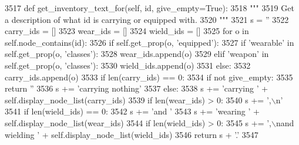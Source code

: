 \begin{DoxyCode}
3517     \textcolor{keyword}{def }get\_inventory\_text\_for(self, id, give\_empty=True):
3518         \textcolor{stringliteral}{"""}
3519 \textcolor{stringliteral}{        Get a description of what id is carrying or equipped with.}
3520 \textcolor{stringliteral}{        """}
3521         s = \textcolor{stringliteral}{''}
3522         carry\_ids = []
3523         wear\_ids = []
3524         wield\_ids = []
3525         \textcolor{keywordflow}{for} o \textcolor{keywordflow}{in} self.node\_contains(id):
3526             \textcolor{keywordflow}{if} self.get\_prop(o, \textcolor{stringliteral}{'equipped'}):
3527                 \textcolor{keywordflow}{if} \textcolor{stringliteral}{'wearable'} \textcolor{keywordflow}{in} self.get\_prop(o, \textcolor{stringliteral}{'classes'}):
3528                     wear\_ids.append(o)
3529                 \textcolor{keywordflow}{elif} \textcolor{stringliteral}{'weapon'} \textcolor{keywordflow}{in} self.get\_prop(o, \textcolor{stringliteral}{'classes'}):
3530                     wield\_ids.append(o)
3531             \textcolor{keywordflow}{else}:
3532                 carry\_ids.append(o)
3533         \textcolor{keywordflow}{if} len(carry\_ids) == 0:
3534             \textcolor{keywordflow}{if} \textcolor{keywordflow}{not} give\_empty:
3535                 \textcolor{keywordflow}{return} \textcolor{stringliteral}{''}
3536             s += \textcolor{stringliteral}{'carrying nothing'}
3537         \textcolor{keywordflow}{else}:
3538             s += \textcolor{stringliteral}{'carrying '} + self.display\_node\_list(carry\_ids)
3539         \textcolor{keywordflow}{if} len(wear\_ids) > 0:
3540             s += \textcolor{stringliteral}{',\(\backslash\)n'}
3541             \textcolor{keywordflow}{if} len(wield\_ids) == 0:
3542                 s += \textcolor{stringliteral}{'and '}
3543             s += \textcolor{stringliteral}{'wearing '} + self.display\_node\_list(wear\_ids)
3544         \textcolor{keywordflow}{if} len(wield\_ids) > 0:
3545             s += \textcolor{stringliteral}{',\(\backslash\)nand wielding '} + self.display\_node\_list(wield\_ids)
3546         \textcolor{keywordflow}{return} s + \textcolor{stringliteral}{'.'}
3547 
\end{DoxyCode}
\mbox{\label{classlight__chats_1_1graph_1_1Graph_a4fa84ee088a8086336cf51a1c41a0477}} 

